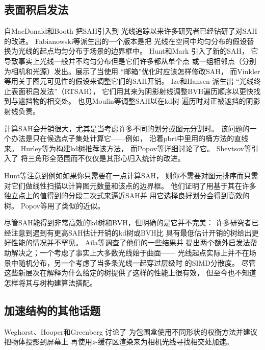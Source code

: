 \subsection{表面积启发法}\label{sub:表面积启发法2}
自MacDonald和Booth \parencite*{MacDonald1990}把SAH引入到
光线追踪以来许多研究者已经钻研了对SAH的改进。
Fabianowski等\parencite*{10.2312:egs.20091046}派生出的一个版本是把
光线在空间中均匀分布的假设替换为光线的起点均匀分布于场景的边界框中。
Hunt和Mark \parencite*{4634614}引入了新的SAH，
它导致事实上光线一般并不均匀分布但是它们许多都从单个点
或一组相邻点（分别为相机和光源）发出。\citet{4634625}展示了当使用
“邮箱”优化时应该怎样修改SAH，
而Vinkler等\parencite*{VINKLER2012283}用关于图元可见性的假设来调整它们的SAH开销。
Ize和Hansen \parencite*{10.1111/j.1467-8659.2011.01861.x}派生出
“光线终止表面积启发法”（RTSAH），
它们用其来为阴影射线调整BVH遍历顺序以更快找到与遮挡物的相交处。
也见Moulin等\parencite*{10.2312:sre.20151164}调整SAH以在kd树
遍历时对正被遮挡的阴影射线负责。

计算SAH会开销很大，尤其是当考虑许多不同的划分或图元分割时。
该问题的一个办法是只在候选点子集处计算它——例如，
沿着pbrt中里用的桶方法的直线来。
Hurley等\parencite*{hurley2002fast}为构建kd树推荐该方法，
而Popov等\parencite*{4061550}详细讨论了它。
Shevtsov等\parencite*{10.1111/j.1467-8659.2007.01062.x}引入了
将三角形全范围而不仅仅是其形心归入统计的改进。

Hunt等\parencite*{4061549}注意到例如如果你只需要在一点计算SAH，
则你不需要对图元排序而只需对它们做线性扫描以计算图元数量和该点的边界框。
他们证明了用基于其在许多独立点上的值得到的分段二次式来逼近SAH并
用它选择良好划分会得到高效的树。
Popov等\parencite*{4061550}用了类似的近似。

尽管SAH能得到非常高效的kd树和BVH，但明确的是它并不完美：
许多研究者已经注意到遇到有更高SAH估计开销的kd树或BVH比
具有最低估计开销的树给出更好性能的情况并不罕见。
Aila等\parencite*{10.1145/2492045.2492056}调查了他们的一些结果并
提出两个额外启发法帮助解决之；一个考虑了事实上大多数光线始于曲面——
光线起点实际上并不在场景中随机分布，另一个考虑了当多条光线一起穿过层级时
的SIMD分散度。
尽管这些新层次在解释为什么给定的树提供了这样的性能上很有效，
但至今也不知道怎样将其与树构建算法搭配。

\subsection{加速结构的其他话题}\label{sub:加速结构的其他话题}
Weghorst、Hooper和Greenberg \parencite*{10.1145/357332.357335}讨论了
为包围盒使用不同形状的权衡方法并建议把物体投影到屏幕上
再使用$z$-缓存区渲染来为相机光线寻找相交处加速。

